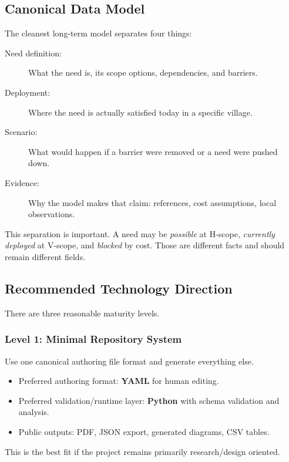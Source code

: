 \documentclass[11pt,a4paper]{article}
\begin{document}
\subsection{Canonical Data Model}

The cleanest long-term model separates four things:

\begin{description}
    \item[Need definition:] What the need is, its scope options, dependencies, and barriers.
    \item[Deployment:] Where the need is actually satisfied today in a specific village.
    \item[Scenario:] What would happen if a barrier were removed or a need were pushed down.
    \item[Evidence:] Why the model makes that claim: references, cost assumptions, local observations.
\end{description}

This separation is important. A need may be \textit{possible} at H-scope, \textit{currently deployed} at V-scope, 
and \textit{blocked} by cost. Those are different facts and should remain different fields.

\subsection{Recommended Technology Direction}

There are three reasonable maturity levels.

\subsubsection{Level 1: Minimal Repository System}

Use one canonical authoring file format and generate everything else.

\begin{itemize}
    \item Preferred authoring format: \textbf{YAML} for human editing.
    \item Preferred validation/runtime layer: \textbf{Python} with schema validation and analysis.
    \item Public outputs: PDF, JSON export, generated diagrams, CSV tables.
\end{itemize}

This is the best fit if the project remains primarily research/design oriented.
\end{document}
